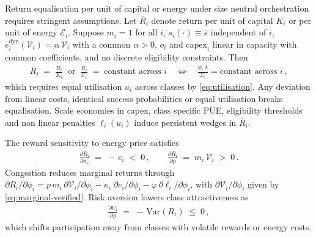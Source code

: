 \documentclass[oneside,10pt]{swissi}
\begin{document}
Return equalisation per unit of capital or energy under size neutral orchestration requires stringent assumptions. Let \(\bar R_i\) denote return per unit of capital \(K_i\) or per unit of energy \(\mathcal{E}_i\). Suppose \(m_i=1\) for all \(i\), \(s_i(\cdot)\equiv \bar s\) independent of \(i\), \(e_i^{\mathrm{dyn}}(\mathcal{V}_i)=\alpha\,\mathcal{V}_i\) with a common \(\alpha>0\), \(o_i\) and \(\mathrm{capex}_i\) linear in capacity with common coefficients, and no discrete eligibility constraints. Then
\begin{align}
\bar R_i \;=\; \frac{R_i}{K_i}\;\; \text{or} \;\; \frac{R_i}{\mathcal{E}_i} \;=\; \text{constant across } i \quad \Longleftrightarrow \quad \frac{\phi_i\,\lambda}{\Sigma_i}=\text{constant across } i\,,
\label{eq:equalisation}
\end{align}
which requires equal utilisation \(u_i\) across classes by \eqref{eq:utilisation}. Any deviation from linear costs, identical success probabilities or equal utilisation breaks equalisation. Scale economies in capex, class specific PUE, eligibility thresholds and non linear penalties \(\ell_i(u_i)\) induce persistent wedges in \(\bar R_i\).

The reward sensitivity to energy price satisfies
\begin{align}
\frac{\partial R_i}{\partial \kappa_e} \;=\; -\,e_i \;<\; 0\,,
\qquad
\frac{\partial R_i}{\partial p} \;=\; m_i\,\mathcal{V}_i \;>\; 0\,.
\label{eq:comparative-statics}
\end{align}
Congestion reduces marginal returns through \(\partial R_i/\partial \phi_i = p\,m_i\,\partial \mathcal{V}_i/\partial \phi_i - \kappa_e\,\partial e_i/\partial \phi_i - \varphi\,\partial \ell_i/\partial \phi_i\), with \(\partial \mathcal{V}_i/\partial \phi_i\) given by \eqref{eq:marginal-verified}. Risk aversion lowers class attractiveness as
\begin{align}
\frac{\partial U_i}{\partial \rho} \;=\; -\,\mathrm{Var}(R_i) \;\le\; 0\,,
\label{eq:risk}
\end{align}
which shifts participation away from classes with volatile rewards or energy costs.
\end{document}

